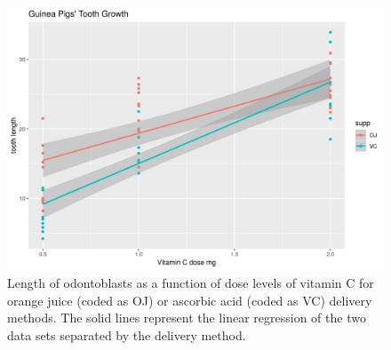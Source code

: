 \documentclass[a4paper,12pt]{article}
\begin{document}
\begin{figure}[!h]
\centering
\includegraphics[width=11 cm]{Tootgrowth.png}
\caption{ \label{fig:Tooth2}
Length of odontoblasts as a function of dose levels of vitamin C  for orange juice (coded as OJ) or ascorbic acid (coded as VC) delivery methods. The solid lines represent the linear regression of the two data sets separated by the delivery method.}
\end{figure}
\end{document}
